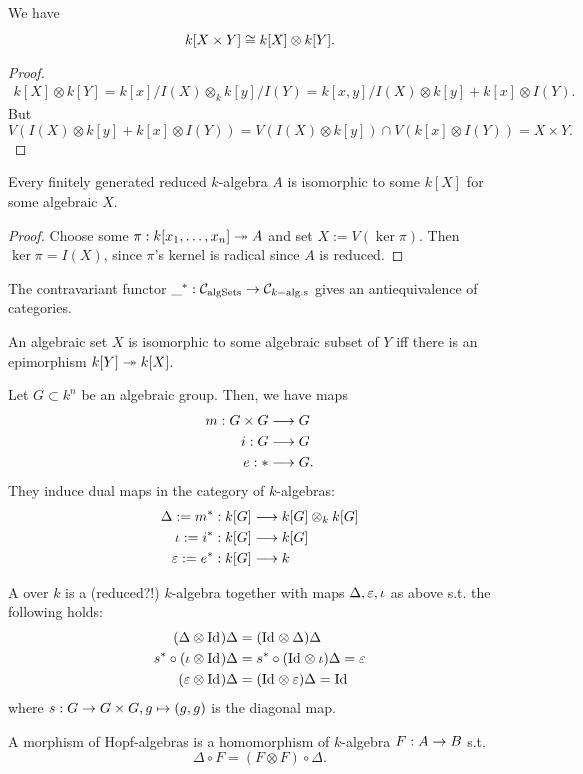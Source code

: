 \begin{lemma}
	We have
	\[ k[X \times Y] \overset{}{\cong} k[X] \otimes k[Y]. \]
\end{lemma}
\begin{proof}
\begin{align*}
k[X] \otimes k[Y] = k[x] / I(X) \otimes_k k[y] / I(Y) = k[x,y] / I(X) \otimes k[y] + k[x] \otimes I(Y).
\end{align*}
But
\[ V(I(X) \otimes k[y] + k[x] \otimes I(Y)) = V(I(X) \otimes k[y])\cap V(k[x] \otimes I(Y)) = X \times Y. \]
\end{proof}
\begin{theorem}
	Every finitely generated reduced $k$-algebra $A$ is isomorphic to some $k[X]$ for some algebraic $X$.
\end{theorem}
\begin{proof}
	Choose some $\pi : k[x_1,\ldots, x_n] \overset{}{\twoheadrightarrow} A$ and set $X := V(\ker \pi)$. Then $\ker \pi = I(X)$, since $\pi$'s kernel is radical since $A$ is reduced.
\end{proof}
\begin{corollary}
	The contravariant functor $\_^* : \mathcal{C}_{\mathrm{algSets}} \overset{}{\rightarrow} \mathcal{C}_{k\mathrm{-alg.s}}$ gives an antiequivalence of categories.
\end{corollary}
\begin{lemma}
	An algebraic set $X$ is isomorphic to some algebraic subset of $Y$ iff there is an epimorphism $k[Y] \overset{}{\twoheadrightarrow} k[X]$.
\end{lemma}


\begin{lemma}
Let $G \subset k^n$ be an algebraic group. Then, we have maps
\begin{align*}
m: G \times G &\overset{}{\longrightarrow} G\\
i : G & \overset{}{\longrightarrow} G\\
e : * & \overset{}{\longrightarrow} G.
\end{align*}
They induce dual maps in the category of $k$-algebras:
\begin{align*}
\Delta := m^* : k[G] & \overset{}{\longrightarrow} k[G] \otimes_k k[G]\\
\iota := i^* : k[G] &\overset{}{\longrightarrow} k[G]\\
\varepsilon := e^* : k[G] &\overset{}{\longrightarrow} k
\end{align*}
\end{lemma}
\begin{definition}
A  over $k$ is a (reduced?!) $k$-algebra together with maps $\Delta, \varepsilon, \iota $ as above s.t. the following holds:
\begin{align*}
(\Delta\otimes \text{Id}_{})\Delta &= (\text{Id}_{} \otimes \Delta)\Delta\\
s^* \circ (\iota\otimes \text{Id}_{})\Delta &= s^* \circ (\text{Id}_{} \otimes \iota)\Delta = \varepsilon\\
(\varepsilon\otimes \text{Id}_{})\Delta &= (\text{Id}_{} \otimes \varepsilon)\Delta = \text{Id}_{}
\end{align*}
where $s : G \overset{}{\rightarrow} G \times G, g \mapsto (g,g)$ is the diagonal map.


A morphism of Hopf-algebras is a homomorphism of $k$-algebra $F : A \overset{}{\rightarrow} B$ s.t.
\[ \Delta \circ F = (F\otimes F) \circ \Delta. \]
\end{definition}

